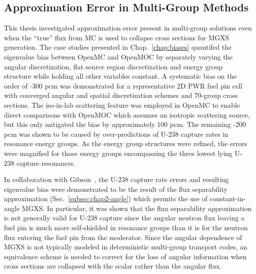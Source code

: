 \subsection{Approximation Error in Multi-Group Methods}
\label{subsec:chap12-approx-error}

This thesis investigated approximation error present in multi-group solutions even when the ``true'' flux from \ac{MC} is used to collapse cross sections for \ac{MGXS} generation. The case studies presented in Chap.~\ref{chap:biases} quantifed the eigenvalue bias between OpenMC and OpenMOC by separately varying the angular discretization, flat source region discretization and energy group structure while holding all other variables constant. A systematic bias on the order of -300 \ac{pcm} was demonstrated for a representative 2D \ac{PWR} fuel pin cell with converged angular and spatial discretization schemes and 70-group cross sections. The iso-in-lab scattering feature was employed in OpenMC to enable direct comparisons with OpenMOC which assumes an isotropic scattering source, but this only mitigated the bias by approximately 100 \ac{pcm}. The remaining -200 \ac{pcm} was shown to be caused by over-predictions of U-238 capture rates in resonance energy groups. As the energy group structures were refined, the errors were magnified for those energy groups encompassing the three lowest lying U-238 capture resonances.


In collaboration with Gibson~\cite{gibson2016thesis}, the U-238 capture rate errors and resulting eigenvalue bias were demonstrated to be the result of the flux separability approximation (Sec.~\ref{subsec:chap2-angle}) which permits the use of constant-in-angle \ac{MGXS}. In particular, it was shown that the flux separability approximation is not generally valid for U-238 capture since the angular neutron flux leaving a fuel pin is much more self-shielded in resonance groups than it is for the neutron flux entering the fuel pin from the moderator. Since the angular dependence of \ac{MGXS} is not typically modeled in deterministic multi-group transport codes, an equivalence scheme is needed to correct for the loss of angular information when cross sections are collapsed with the scalar rather than the angular flux. 

